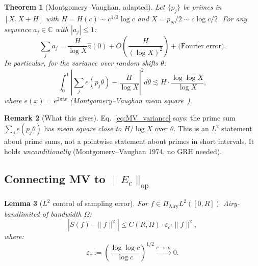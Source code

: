 \documentclass[12pt,a4paper]{amsart}
\newtheorem{theorem}{Theorem}[section]
\newtheorem{lemma}[theorem]{Lemma}
\theoremstyle{definition}
\newtheorem{remark}[theorem]{Remark}
\newcommand{\PAi}{\Pi_{\mathrm{Airy}}}
\newcommand{\norm}[1]{\|#1\|}
\newcommand{\abs}[1]{\left|#1\right|}
\newcommand{\Ec}{E_c}
\begin{document}
\begin{theorem}[Montgomery--Vaughan, adapted]\label{thm:MV}
Let $\{p_j\}$ be primes in $[X, X+H]$ with $H = H(c) \sim c^{1/3}\log c$
and $X = p_N/2 \sim c\log c/2$.
For any sequence $a_j \in \mathbb{C}$ with $\abs{a_j} \le 1$:
\[
  \sum_{j} a_j
  = \frac{H}{\log X}\hat{a}(0)
    + O\!\left(\frac{H}{(\log X)^2}\right)
    + \text{(Fourier error)}.
\]
In particular, for the \emph{variance} over random shifts $\theta$:
\begin{equation}\label{eq:MV_variance}
  \int_0^1 \left|\sum_j e(p_j \theta) - \frac{H}{\log X}\right|^2 d\theta
  \lesssim H \cdot \frac{\log\log X}{\log X},
\end{equation}
where $e(x) = e^{2\pi i x}$ (Montgomery--Vaughan mean square~\cite{MV1974}).
\end{theorem}

\begin{remark}[What this gives]
Eq.~\eqref{eq:MV_variance} says: the prime sum $\sum_j e(p_j\theta)$
has \emph{mean square close to $H/\log X$} over $\theta$.
This is an $L^2$ statement about prime sums,
not a pointwise statement about primes in short intervals.
It holds \emph{unconditionally} (Montgomery--Vaughan 1974, no GRH needed).
\end{remark}

\subsection{Connecting MV to $\norm{\Ec}_{\mathrm{op}}$}

\begin{lemma}[$L^2$ control of sampling error]\label{lem:L2control}
For $f \in \PAi L^2([0,R])$ Airy-bandlimited of bandwidth $\Omega$:
\begin{equation}\label{eq:L2control}
  \abs{S(f) - \norm{f}^2}
  \le C(R,\Omega) \cdot \varepsilon_c \cdot \norm{f}^2,
\end{equation}
where:
\[
  \varepsilon_c
  := \left(\frac{\log\log c}{\log c}\right)^{1/2} \xrightarrow{c\to\infty} 0.
\]
\end{lemma}
\end{document}
